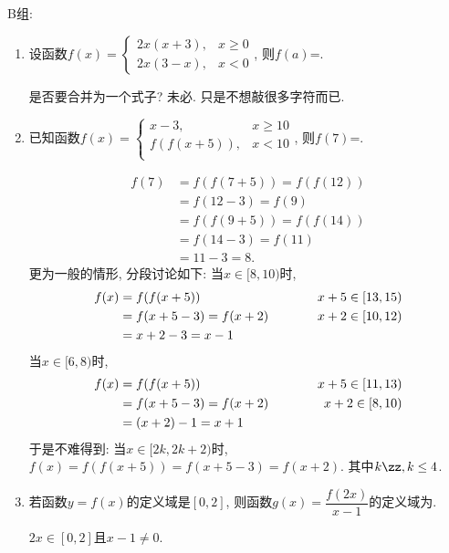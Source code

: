 B组: 
\begin{enumerate}
    \item 设函数$f(x)=\begin{cases}
2x(x+3), & x\geq 0\\
2x(3-x), & x<0
\end{cases}$, 
则$f(a)$=. 
\begin{jieda}
是否要合并为一个式子? 未必. 只是不想敲很多字符而已. 
\end{jieda}

\item 已知函数$f(x)=\begin{cases}
x-3, & x\geq 10\\
f(f(x+5)), & x<10\\    
\end{cases}$, 
则$f(7)$=.
\begin{jieda}
\begin{align*}
f(7) & =f(f(7+5))=f(f(12))\\
& =f(12-3)=f(9)\\
& =f(f(9+5))=f(f(14))\\
& =f(14-3)=f(11)\\
& =11-3=8.
\end{align*}
更为一般的情形, 分段讨论如下: 当$x\in[8,10)$时, 
\begin{align*}
f(x) & = f(f(x+5)) & \hspace*{1cm} x+5\in[13,15)\\
& = f(x+5-3)=f(x+2) & \hspace*{1cm} x+2\in[10,12)\\
& = x+2-3=x-1 & 
\end{align*}
当$x\in[6,8)$时, 
\begin{align*}
f(x) & = f(f(x+5)) & \hspace*{1cm} x+5\in[11,13)\\
& = f(x+5-3)=f(x+2) & \hspace*{1cm} x+2\in[8,10)\\
& = (x+2)-1=x+1
\end{align*}
于是不难得到: 当$x\in[2k,2k+2)$时, $f(x)=f(f(x+5))=f(x+5-3)=f(x+2)$. 其中$k\zz,k\leq 4$. 
\end{jieda}

\item 若函数$y=f(x)$的定义域是$[0,2]$, 则函数$g(x)=\dfrac{f(2x)}{x-1}$的定义域为\blkda{$[0,1)$}. 
\begin{jieda}
$2x\in[0,2]$且$ x-1\neq 0$. 
\end{jieda}


\end{enumerate}
